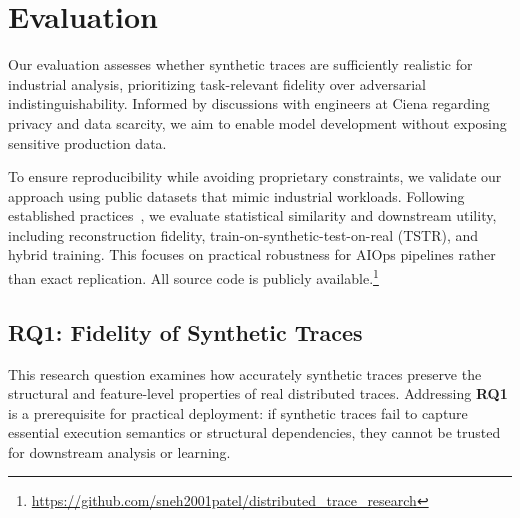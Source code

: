 \documentclass[sigconf,review]{acmart}
\begin{document}
\section{Evaluation}
\label{sec:evaluation}

Our evaluation assesses whether synthetic traces are sufficiently realistic for industrial analysis, prioritizing task-relevant fidelity over adversarial indistinguishability. Informed by discussions with engineers at Ciena regarding privacy and data scarcity, we aim to enable model development without exposing sensitive production data. 

To ensure reproducibility while avoiding proprietary constraints, we validate our approach using public datasets that mimic industrial workloads. Following established practices~\cite{esteban2017real,goncalves2020generation}, we evaluate statistical similarity and downstream utility, including reconstruction fidelity, train-on-synthetic-test-on-real (TSTR), and hybrid training. This focuses on practical robustness for AIOps pipelines rather than exact replication. All source code is publicly available.\footnote{\url{https://github.com/sneh2001patel/distributed_trace_research}}




\subsection{RQ1: Fidelity of Synthetic Traces}
\label{sec:rq1}

This research question examines how accurately synthetic traces preserve the structural and feature-level properties of real distributed traces. Addressing \textbf{RQ1} is a prerequisite for practical deployment: if synthetic traces fail to capture essential execution semantics or structural dependencies, they cannot be trusted for downstream analysis or learning.
\end{document}

